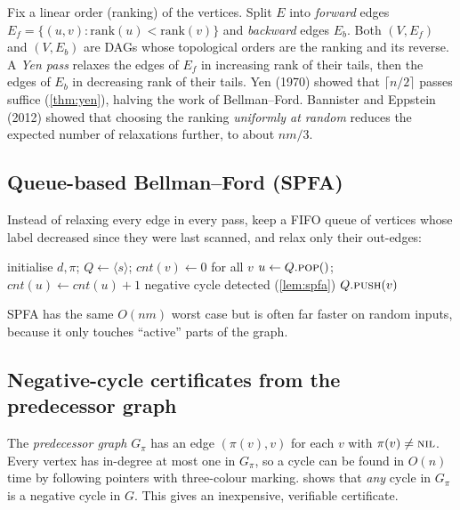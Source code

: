 \documentclass[11pt,a4paper]{article}
\theoremstyle{definition}
\newcommand{\dd}{\mathit{d}}
\newcommand{\pred}{\pi}
\begin{document}
Fix a linear order (ranking) of the vertices. Split $E$ into \emph{forward} edges $E_f=\{(u,v): \mathrm{rank}(u)<\mathrm{rank}(v)\}$ and \emph{backward} edges $E_b$. Both $(V,E_f)$ and $(V,E_b)$ are DAGs whose topological orders are the ranking and its reverse. A \emph{Yen pass} relaxes the edges of $E_f$ in increasing rank of their tails, then the edges of $E_b$ in decreasing rank of their tails. Yen (1970) showed that $\lceil n/2\rceil$ passes suffice (\cref{thm:yen}), halving the work of Bellman--Ford. Bannister and Eppstein (2012) showed that choosing the ranking \emph{uniformly at random} reduces the expected number of relaxations further, to about $nm/3$.

\subsection{Queue-based Bellman--Ford (SPFA)}

Instead of relaxing every edge in every pass, keep a FIFO queue of vertices whose label decreased since they were last scanned, and relax only their out-edges:

\begin{algorithm}[h]
\caption{\textsc{SPFA}$(G,w,s)$}
\label{alg:spfa}
\begin{algorithmic}[1]
\State initialise $\dd,\pred$; $Q\gets\langle s\rangle$; $\mathit{cnt}(v)\gets 0$ for all $v$
  \State $u\gets Q.\textsc{pop}()$; $\mathit{cnt}(u)\gets\mathit{cnt}(u)+1$
   \State negative cycle detected (\cref{lem:spfa}) \EndIf
     \If{\textsc{Relax}$(u,v)$ decreased $\dd(v)$ \textbf{and} $v\notin Q$} $Q.\textsc{push}(v)$\EndIf
  \EndFor
\EndWhile
\end{algorithmic}
\end{algorithm}

SPFA has the same $O(nm)$ worst case but is often far faster on random inputs, because it only touches ``active'' parts of the graph.

\subsection{Negative-cycle certificates from the predecessor graph}

The \emph{predecessor graph} $G_\pred$ has an edge $(\pred(v),v)$ for each $v$ with $\pred(v)\neq\textsc{nil}$. Every vertex has in-degree at most one in $G_\pred$, so a cycle can be found in $O(n)$ time by following pointers with three-colour marking.  shows that \emph{any} cycle in $G_\pred$ is a negative cycle in $G$. This gives an inexpensive, verifiable certificate.
\end{document}
